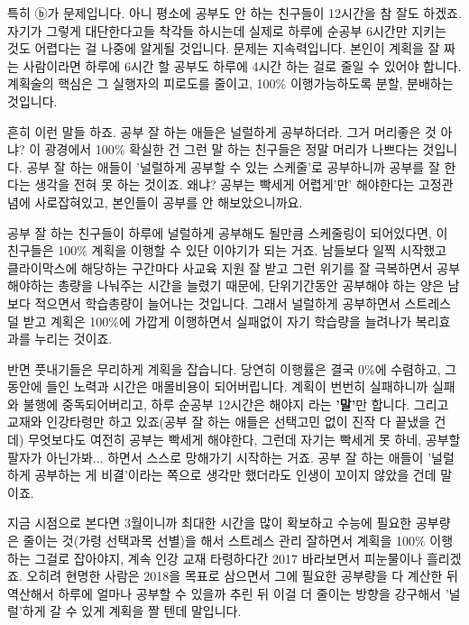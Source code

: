 특히 ⓑ가 문제입니다. 아니 평소에 공부도 안 하는 친구들이 12시간을 참 잘도 하겠죠.
자기가 그렇게 대단한다고들 착각들 하시는데 실제로 하루에 순공부 6시간만 지키는 것도 어렵다는 걸 나중에 알게될 것입니다.
문제는 지속력입니다. 본인이 계획을 잘 짜는 사람이라면 하루에 6시간 할 공부도 하루에 4시간 하는 걸로 줄일 수 있어야 합니다.
계획술의 핵심은 그 실행자의 피로도를 줄이고, 100$\%$ 이행가능하도록 분할, 분배하는 것입니다.
\vspace{5mm}

흔히 이런 말들 하죠. 공부 잘 하는 애들은 널럴하게 공부하더라. 그거 머리좋은 것 아냐?
이 광경에서 100$\%$ 확실한 건 그런 말 하는 친구들은 정말 머리가 나쁘다는 것입니다.
공부 잘 하는 애들이 '널럴하게 공부할 수 있는 스케줄'로 공부하니까 공부를 잘 한다는 생각을 전혀 못 하는 것이죠.
왜냐? 공부는 빡세게 어렵게'만' 해야한다는 고정관념에 사로잡혀있고, 본인들이 공부를 안 해보았으니까요.
\vspace{5mm}

공부 잘 하는 친구들이 하루에 널럴하게 공부해도 될만큼 스케줄링이 되어있다면, 이 친구들은 100$\%$ 계획을 이행할 수 있단 이야기가 되는 거죠.
남들보다 일찍 시작했고 클라이막스에 해당하는 구간마다 사교육 지원 잘 받고 그런 위기를 잘 극복하면서
공부해야하는 총량을 나눠주는 시간을 늘렸기 때문에, 단위기간동안 공부해야 하는 양은 남보다 적으면서 학습총량이 늘어나는 것입니다.
그래서 널럴하게 공부하면서 스트레스 덜 받고 계획은 100$\%$에 가깝게 이행하면서 실패없이 자기 학습량을 늘려나가 복리효과를 누리는 것이죠.
\vspace{5mm}

반면 풋내기들은 무리하게 계획을 잡습니다. 당연히 이행률은 결국 0$\%$에 수렴하고, 그동안에 들인 노력과 시간은 매몰비용이 되어버립니다.
계획이 번번히 실패하니까 실패와 불행에 중독되어버리고, 하루 순공부 12시간은 해야지 라는 \textbf{'말'}만 합니다.
그리고 교재와 인강타령만 하고 있죠(공부 잘 하는 애들은 선택고민 없이 진작 다 끝냈을 건데)
무엇보다도 여전히 공부는 빡세게 해야한다, 그런데 자기는 빡세게 못 하네, 공부할 팔자가 아닌가봐... 하면서 스스로 망해가기 시작하는 거죠.
공부 잘 하는 애들이 '널럴하게 공부하는 게 비결'이라는 쪽으로 생각만 했더라도 인생이 꼬이지 않았을 건데 말이죠.
\vspace{5mm}

지금 시점으로 본다면 3월이니까 최대한 시간을 많이 확보하고 수능에 필요한 공부량은 줄이는 것(가령 선택과목 선별)을 해서
스트레스 관리 잘하면서 계획을 100$\%$ 이행하는 그걸로 잡아야지, 계속 인강 교재 타령하다간 2017 바라보면서 피눈물이나 흘리겠죠.
오히려 현명한 사람은 2018을 목표로 삼으면서 그에 필요한 공부량을 다 계산한 뒤 역산해서 하루에 얼마나 공부할 수 있을까 추린 뒤
이걸 더 줄이는 방향을 강구해서 '널럴'하게 갈 수 있게 계획을 짤 텐데 말입니다.
\vspace{5mm}

